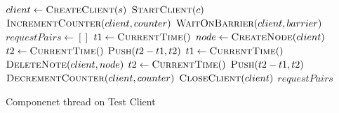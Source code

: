 \begin{algorithm}[ht!]
	\begin{algorithmic}
			\State $client\gets \Call{CreateClient}{s}$
			\State $\Call{StartClient}{c}$
			\State $\Call{IncrementCounter}{client, counter}$
			\State $\Call{WaitOnBarrier}{client, barrier}$
			\State $requestPairs\gets []$
			\State $t1\gets \Call{CurrentTime}{\null}$
			\State $node\gets \Call{CreateNode}{client}$
			\State $t2 \gets \Call{CurrentTime}{\null}$
			\State $\Call{Push}{t2-t1,t2}$
			\State $t1\gets\Call{CurrentTime}{\null}$
			\State $\Call{DeleteNote}{client, node}$
			\State $t2\gets \Call{CurrentTime}{\null}$
			\State $\Call{Push}{t2-t1,t2}$
			\EndWhile
			\State $\Call{DecrementCounter}{client, counter}$
			\State $\Call{CloseClient}{client}$
			\State \Return $requestPairs$
		\EndProcedure
	\end{algorithmic}
	\caption{Componenet thread on Test Client}
	\label{algo:testClientThread}
\end{algorithm}
